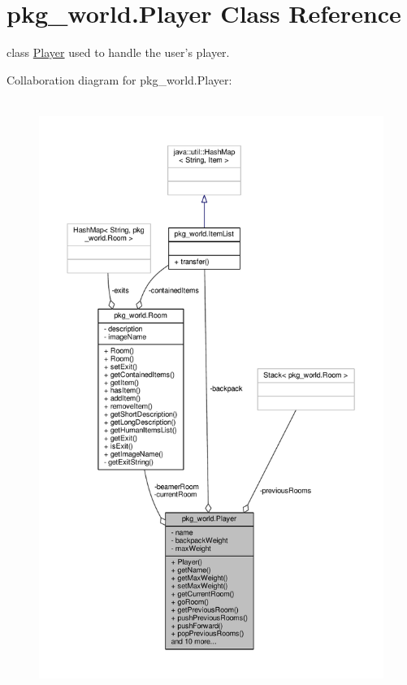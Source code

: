\hypertarget{classpkg__world_1_1Player}{\section{pkg\-\_\-world.\-Player Class Reference}
\label{classpkg__world_1_1Player}
}


class \hyperlink{classpkg__world_1_1Player}{Player} used to handle the user's player.  




Collaboration diagram for pkg\-\_\-world.\-Player\-:\nopagebreak
\begin{figure}[H]
\begin{center}
\leavevmode
\includegraphics[height=550pt]{classpkg__world_1_1Player__coll__graph}
\end{center}
\end{figure}
